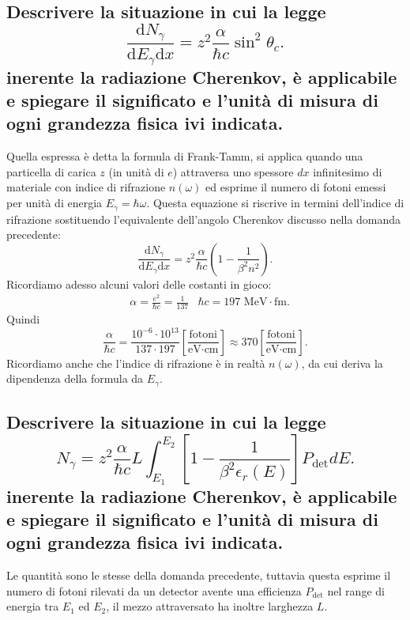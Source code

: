 \subsection[]{Descrivere la situazione in cui la legge 
\[
	\frac{\mbox{d} N_{\gamma}}{\mbox{d} E_{\gamma}\text{d}x} = z^2 \frac{\alpha}{\hbar c} \sin^2\theta_{c}
.\] 
inerente la radiazione Cherenkov, è applicabile e spiegare il significato e l'unità di misura di ogni grandezza fisica ivi indicata.
}\label{sec:4.a.7}
Quella espressa è detta la formula di Frank-Tamm, si applica quando una particella di carica $z$ (in unità di $e$) attraversa uno spessore $dx$ infinitesimo di materiale con indice di rifrazione $n\left( \omega \right)$ ed esprime il numero di fotoni emessi per unità di energia $E_{\gamma}= \hbar \omega$. 
Questa equazione si riscrive in termini dell'indice di rifrazione sostituendo l'equivalente dell'angolo Cherenkov discusso nella domanda precedente:
\[	
	\frac{\mbox{d} N_{\gamma}}{\mbox{d} E_{\gamma}\text{d}x} = z^2 \frac{\alpha}{\hbar c} \left( 1- \frac{1}{\beta^2 n^2} \right)  
.\] 
Ricordiamo adesso alcuni valori delle costanti in gioco:
\begin{align*}
	&\alpha = \frac{e^2}{\hbar c}= \frac{1}{137}	&\hbar c = 197 \text{ MeV}\cdot \text{fm}
.\end{align*}
Quindi \[
	\frac{\alpha}{\hbar c}= \frac{10^{-6}\cdot 10^{13}}{137\cdot 197} \left[ \frac{\text{fotoni}}{\text{eV}\cdot \text{cm}} \right] \approx 
	370 \left[ \frac{\text{fotoni}}{\text{eV}\cdot \text{cm}} \right]
.\] 
Ricordiamo anche che l'indice di rifrazione è in realtà $n\left( \omega \right) $, da cui deriva la dipendenza della formula da $E_{\gamma}$.

\subsection[]{Descrivere la situazione in cui la legge 
\[
	N_{\gamma}= z^2 \frac{\alpha}{\hbar c}L \int_{E_1}^{E_2} \left[ 1 - \frac{1}{\beta^2 \epsilon_{r}\left( E \right)}\right]P_{\text{det}}dE 	
.\] 
inerente la radiazione Cherenkov, è applicabile e spiegare il significato e l'unità di misura di ogni grandezza fisica ivi indicata.
}\label{sec:4.a.8}
Le quantità sono le stesse della domanda precedente, tuttavia questa esprime il numero di fotoni rilevati da un detector avente una efficienza $P_{\text{det}}$ nel range di energia tra $E_1$ ed $E_2$, il mezzo attraversato ha inoltre larghezza $L$.
